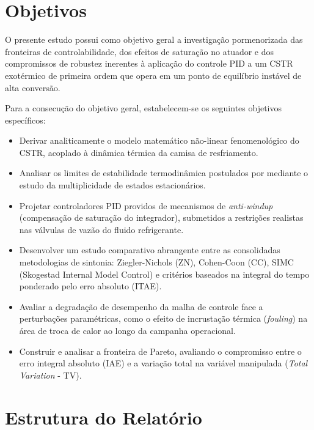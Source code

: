 \section{Objetivos}
\label{sec:objetivos}

O presente estudo possui como objetivo geral a investigação pormenorizada das fronteiras de controlabilidade, dos efeitos de saturação no atuador e dos compromissos de robustez inerentes à aplicação do controle PID a um CSTR exotérmico de primeira ordem que opera em um ponto de equilíbrio instável de alta conversão.

Para a consecução do objetivo geral, estabelecem-se os seguintes objetivos específicos:
\begin{itemize}
    \item Derivar analiticamente o modelo matemático não-linear fenomenológico do CSTR, acoplado à dinâmica térmica da camisa de resfriamento.
    \item Analisar os limites de estabilidade termodinâmica postulados por  mediante o estudo da multiplicidade de estados estacionários.
    \item Projetar controladores PID providos de mecanismos de \textit{anti-windup} (compensação de saturação do integrador), submetidos a restrições realistas nas válvulas de vazão do fluido refrigerante.
    \item Desenvolver um estudo comparativo abrangente entre as consolidadas metodologias de sintonia: Ziegler-Nichols (ZN), Cohen-Coon (CC), SIMC (Skogestad Internal Model Control) e critérios baseados na integral do tempo ponderado pelo erro absoluto (ITAE).
    \item Avaliar a degradação de desempenho da malha de controle face a perturbações paramétricas, como o efeito de incrustação térmica (\textit{fouling}) na área de troca de calor ao longo da campanha operacional.
    \item Construir e analisar a fronteira de Pareto, avaliando o compromisso entre o erro integral absoluto (IAE) e a variação total na variável manipulada (\textit{Total Variation} - TV).
\end{itemize}

\section{Estrutura do Relatório}
\label{sec:estrutura}

